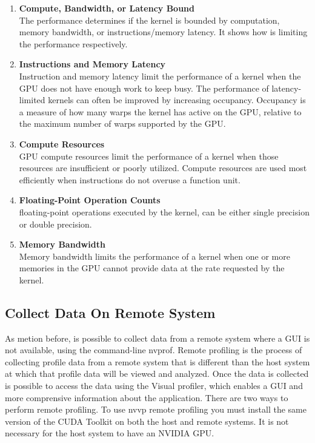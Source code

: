 \begin{enumerate}
  \item \textbf{Compute, Bandwidth, or Latency Bound} \hfill \\
      The performance determines if the kernel is bounded by computation, memory bandwidth, or instructions/memory latency. It shows how is limiting the performance respectively.
  
  \item \textbf{Instructions and Memory Latency} \hfill \\
Instruction and memory latency limit the performance of a kernel when the GPU does not have enough work to keep busy. The performance of latency-limited kernels can often be improved by increasing occupancy. Occupancy is a measure of how many warps the kernel has active on the GPU, relative to the maximum number of warps supported by the GPU.
  
  \item \textbf{Compute Resources} \hfill \\
GPU compute resources limit the performance of a kernel when those resources are insufficient or poorly utilized. Compute resources are used most efficiently when instructions do not overuse a function unit. 
  \item \textbf{Floating-Point Operation Counts} \hfill \\
  floating-point operations executed by the kernel, can be either single precision or double precision.
  
  \item \textbf{Memory Bandwidth} \hfill \\
  Memory bandwidth limits the performance of a kernel when one or more memories in the GPU cannot provide data at the rate requested by the kernel.
\end{enumerate}

\subsection{Collect Data On Remote System}

As metion before, is possible to collect data from a remote system where a GUI is not available, using the command-line nvprof. Remote profiling is the process of collecting profile data from a remote system that is different than the host system at which that profile data will be viewed and analyzed. Once the data is collected is possible to access the data using the Visual profiler, which enables a GUI and more comprensive information about the application. There are two ways to perform remote profiling. To use nvvp remote profiling you must install the same version of the CUDA Toolkit on both the host and remote systems. It is not necessary for the host system to have an NVIDIA GPU. \cite{tool}

